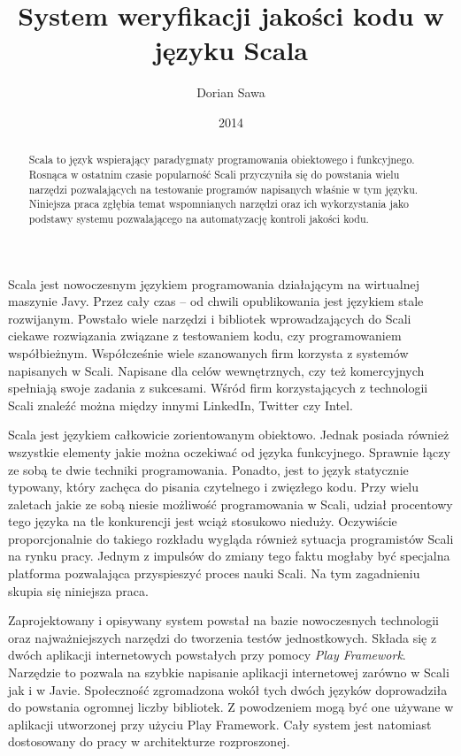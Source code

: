 \documentclass[brudnopis]{xmgr}
\author   {Dorian Sawa}
\title    {System weryfikacji jakości kodu \newline w języku Scala}
\date     {2014}
\begin{document}
\begin{abstract}
Scala to język wspierający paradygmaty programowania obiektowego i funkcyjnego. Rosnąca w ostatnim czasie popularność Scali przyczyniła się do powstania wielu narzędzi pozwalających na testowanie programów napisanych właśnie w tym języku. Niniejsza praca zgłębia temat wspomnianych narzędzi oraz ich wykorzystania jako podstawy systemu pozwalającego na automatyzację kontroli jakości kodu.
\end{abstract}

\maketitle
%
\introduction Scala jest nowoczesnym językiem programowania działającym na wirtualnej maszynie Javy. Przez cały czas -- od chwili opublikowania jest językiem stale rozwijanym. Powstało wiele narzędzi i bibliotek wprowadzających do Scali ciekawe rozwiązania związane z testowaniem kodu, czy programowaniem współbieżnym. Współcześnie wiele szanowanych firm korzysta z systemów napisanych w Scali. Napisane dla celów wewnętrznych, czy też komercyjnych spełniają swoje zadania z sukcesami. Wśród firm korzystających z technologii Scali znaleźć można między innymi LinkedIn, Twitter czy Intel. 

Scala jest językiem całkowicie zorientowanym obiektowo. Jednak posiada również wszystkie elementy jakie można oczekiwać od języka funkcyjnego. Sprawnie łączy ze sobą te dwie techniki programowania. Ponadto, jest to język statycznie typowany, który zachęca do pisania czytelnego i zwięzłego kodu. Przy wielu zaletach jakie ze sobą niesie możliwość programowania w Scali, udział procentowy tego języka na tle konkurencji jest wciąż stosukowo nieduży. Oczywiście proporcjonalnie do takiego rozkładu wygląda również sytuacja programistów Scali na rynku pracy. Jednym z impulsów do zmiany tego faktu mogłaby być specjalna platforma pozwalająca przyspieszyć proces nauki Scali. Na tym zagadnieniu skupia się niniejsza praca.

Zaprojektowany i opisywany system powstał na bazie nowoczesnych technologii oraz najważniejszych narzędzi do tworzenia testów jednostkowych. Składa się z dwóch aplikacji internetowych powstałych przy pomocy \emph{Play Framework}. Narzędzie to pozwala na szybkie napisanie aplikacji internetowej zarówno w Scali jak i w Javie. Społeczność zgromadzona wokół tych dwóch języków doprowadziła do powstania ogromnej liczby bibliotek. Z powodzeniem mogą być one używane w aplikacji utworzonej przy użyciu Play Framework. Cały system jest natomiast dostosowany do pracy w architekturze rozproszonej. 
\end{document}
